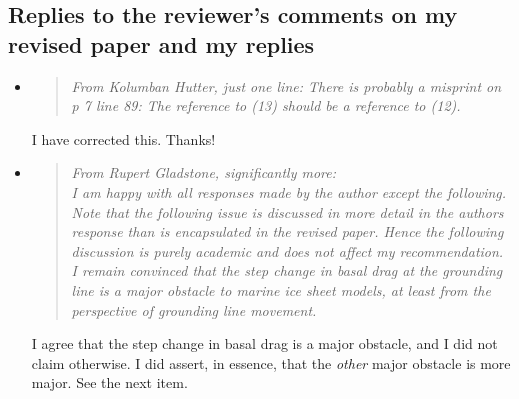 \documentclass[11pt,reqno]{amsart}
\newcommand{\reply}[2]{
\medskip\medskip
\item  \begin{quote}
\emph{#1}
\end{quote}

\medskip
\noindent #2}
\begin{document}
\subsection*{Replies to the reviewer's comments on my revised paper and my replies}  \begin{itemize}
\reply{From Kolumban Hutter, just one line: There is probably a misprint on p 7 line 89: The reference to (13) should be a reference to (12).}{I have corrected this.  Thanks!}

\label{gl}
\reply{From Rupert Gladstone, significantly more: \medskip \\
I am happy with all responses made by the author except the following. Note that the following issue is discussed in more detail in the authors response than is encapsulated in the revised paper. Hence the following discussion is purely academic and does not affect my recommendation. \medskip \\
I remain convinced that the step change in basal drag at the grounding line is a major obstacle to marine ice sheet models, at least from the perspective of grounding line movement.}
{I agree that the step change in basal drag is a major obstacle, and I did not claim otherwise.  I did assert, in essence, that the \emph{other} major obstacle is more major.  See the next item.}


\end{itemize}
\end{document}
